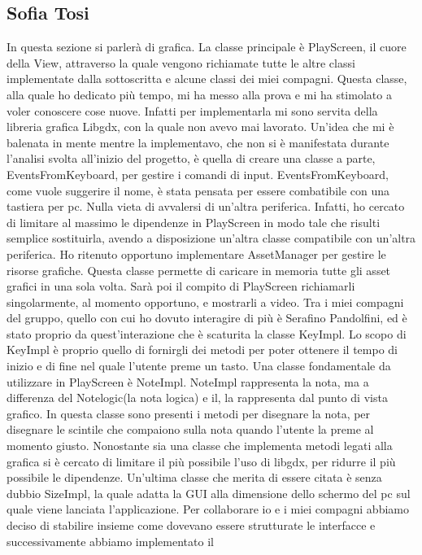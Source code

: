 \documentclass[a4paper,12pt]{report}
\begin{document}
\subsection{Sofia Tosi}
In questa sezione si parlerà di grafica. La classe principale è PlayScreen, il cuore della View, attraverso la
quale vengono richiamate tutte le altre classi implementate dalla sottoscritta e alcune classi dei miei compagni. 
Questa classe, alla quale ho dedicato più tempo, mi ha messo alla prova e mi ha stimolato a voler conoscere cose nuove. Infatti per implementarla
mi sono servita della libreria grafica Libgdx, con la quale non avevo mai lavorato. Un'idea che mi è balenata in mente mentre la implementavo, che non si è 
manifestata durante l'analisi svolta all'inizio del progetto, è quella di creare una classe a parte, EventsFromKeyboard, 
per gestire i comandi di input. EventsFromKeyboard, come vuole suggerire il nome, è stata pensata per essere combatibile con una tastiera per pc. 
Nulla vieta di avvalersi di un'altra periferica. Infatti, ho cercato di limitare al massimo le dipendenze in PlayScreen in modo tale che risulti semplice sostituirla, 
avendo a disposizione un'altra classe compatibile con un'altra periferica.
Ho ritenuto opportuno implementare AssetManager per gestire le risorse grafiche. Questa classe permette di caricare in memoria tutte gli asset grafici in una
sola volta. Sarà poi il compito di PlayScreen richiamarli singolarmente, al momento opportuno, e mostrarli a video.
Tra i miei compagni del gruppo, quello con cui ho dovuto interagire di più è Serafino Pandolfini, ed è stato proprio da quest'interazione che è scaturita la classe
KeyImpl. Lo scopo di KeyImpl è proprio quello di fornirgli dei metodi per poter ottenere il tempo di inizio e di fine nel quale l'utente preme un tasto.
Una classe fondamentale da utilizzare in PlayScreen è NoteImpl. NoteImpl rappresenta la nota, ma a differenza del Notelogic(la nota logica) e il,
la rappresenta dal punto di vista grafico. In questa classe sono presenti i metodi per disegnare la nota, per disegnare le scintile che compaiono sulla nota quando l'utente la
preme al momento giusto. Nonostante sia una classe che implementa metodi legati alla grafica si è cercato di limitare il più possibile l'uso di libgdx, per ridurre il più
possibile le dipendenze. Un'ultima classe che merita di essere citata è senza dubbio SizeImpl, la quale adatta la GUI alla dimensione dello schermo del pc sul quale viene 
lanciata l'applicazione.
Per collaborare io e i miei compagni abbiamo deciso di stabilire insieme come dovevano essere strutturate le interfacce e successivamente abbiamo implementato il
\end{document}

